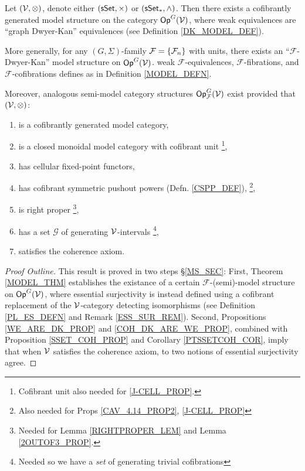 \documentclass[a4paper,10pt
,draft
]{article}%
\renewcommand{\F}{\mathcal F}
\renewcommand{\1}{\eta}%
\begin{document}
\begin{theorem}
      \label{INTRO_MODEL_THM}
      Let $(\mathcal V, \otimes)$, denote either $(\mathsf{sSet}, \times)$ or $(\sSet_{\**}, \wedge)$.
      Then there exists a cofibrantly generated model structure on the category $\mathsf{Op}^G(\mathcal V)$,
      where weak equivalences are ``graph Dwyer-Kan'' equivalences (see Definition \ref{DK_MODEL_DEF}). 

      More generally, for any $(G, \Sigma)$-family $\F = \set{\F_n}$ with units,
      there exists an ``$\F$-Dwyer-Kan'' model structure on $\mathsf{Op}^G(\mathcal V)$.
      weak $\F$-equivalences, $\F$-fibrations, and $\F$-cofibrations defines as in Definition \ref{MODEL_DEFN}.
           
      Moreover, analogous semi-model category structures $\Op^G_\F(\V)$ exist
      provided that $(\mathcal V, \otimes)$:
      \begin{enumerate}[label = (\roman*)]\itemsep-4pt
      \item is a cofibrantly generated model category,
      \item is a closed monoidal model category with cofibrant unit
            \footnote{Cofibrant unit also needed for \ref{J-CELL_PROP}.},
      \item has cellular fixed-point functors,
      \item \label{I_CSPP_LBL} has cofibrant symmetric pushout powers  (Defn. \ref{CSPP_DEF}),
            \footnote{Also needed for Props \ref{CAV_4.14_PROP2}, \ref{J-CELL_PROP}}, %
      \item \label{I_RP_LBL} is right proper
            \footnote{Needed for Lemma \ref{RIGHTPROPER_LEM} and Lemma \ref{2OUTOF3_PROP}.},
      \item \label{I_GENSET_LBL} has a set $\mathscr{G}$ of generating $\mathcal V$-intervals
            \footnote{Needed so we have a \textit{set} of generating trivial cofibrations},
      \item satisfies the coherence axiom.
      \end{enumerate}
\end{theorem}
\begin{proof}
      [Proof Outline]
      This result is proved in two steps \S \ref{MS_SEC}:
      First, Theorem \ref{MODEL_THM} establishes the existance of a certain $\F$-(semi)-model structure on $\mathsf{Op}^G(\mathcal V)$,
      where essential surjectivity is instead defined using a cofibrant replacement of the $\mathcal V$-category detecting isomorphisms
      (see Definition \ref{PL_ES_DEFN} and Remark \ref{ESS_SUR_REM}).
      Second,
      Propositions \ref{WE_ARE_DK_PROP} and \ref{COH_DK_ARE_WE_PROP},
      combined with Proposition \ref{SSET_COH_PROP} and Corollary \ref{PTSSETCOH_COR},
      imply that when $\mathcal V$ satisfies the coherence axiom,
      to two notions of essential surjectivity agree.
\end{proof}
\end{document}
